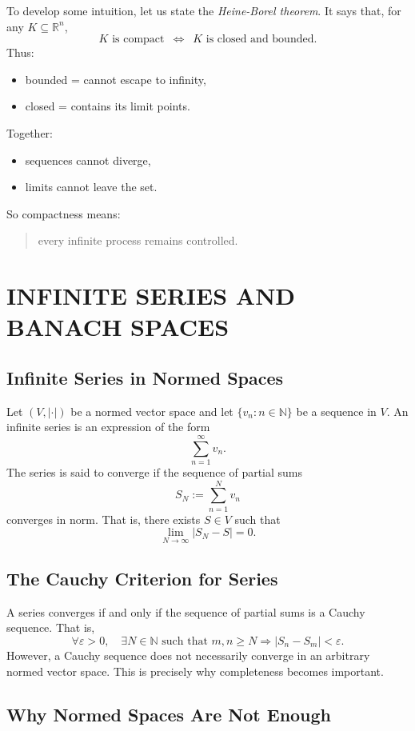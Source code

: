 \documentclass[aps,prl,twocolumn,groupedaddress]{revtex4-2}
\newcommand{\RR}{\mathbb{R}}
\begin{document}
To develop some intuition, let us state the {\em Heine-Borel theorem}.
It says that, for any $K\subseteq \RR^n$,
$$
K \text{ is compact}
\,\,\,
\Longleftrightarrow
\,\,\,
K \text{ is closed and bounded.}
$$
Thus:
\begin{itemize}
\item bounded = cannot escape to infinity,
\item closed = contains its limit points.
\end{itemize}
Together:
\begin{itemize}
\item sequences cannot diverge,
\item limits cannot leave the set.
\end{itemize}
So compactness means:
\begin{quotation}
every infinite process remains controlled.
\end{quotation}

\section{INFINITE SERIES AND BANACH SPACES}

\subsection{Infinite Series in Normed Spaces}

Let $(V,|\cdot|)$ be a normed vector space and let $\{v_n:n\in\mathbb{N}\}$ be a sequence in $V$.
An infinite series is an expression of the form
$$
\sum_{n=1}^\infty v_n.
$$
The series is said to converge if the sequence of partial sums
$$
S_N:=\sum_{n=1}^N v_n
$$
converges in norm.
That is, there exists $S\in V$ such that
$$
\lim_{N\to\infty}|S_N-S|=0.
$$

\subsection{The Cauchy Criterion for Series}

A series converges if and only if the sequence of partial sums is a Cauchy sequence.
That is,
$$
\forall\varepsilon>0,\quad
\exists N\in\mathbb{N}
\text{ such that }
m,n\geq N
\Rightarrow
|S_n-S_m|<\varepsilon.
$$
However, a Cauchy sequence does not necessarily converge in an arbitrary normed vector space.
This is precisely why completeness becomes important.

\subsection{Why Normed Spaces Are Not Enough}
\end{document}
